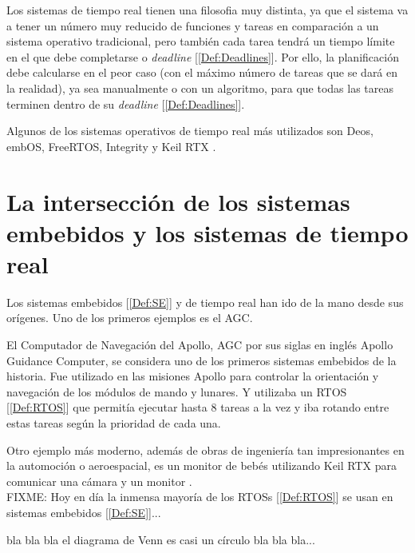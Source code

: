 Los sistemas de tiempo real tienen una filosofia muy distinta, ya que el sistema va a tener un número muy reducido de funciones y tareas en comparación a un sistema operativo tradicional, pero también cada tarea tendrá un tiempo límite en el que debe completarse o \emph{deadline} [\ref{Def:Deadlines}]. Por ello, la planificación debe calcularse en el peor caso (con el máximo número de tareas que se dará en la realidad), ya sea manualmente o con un algoritmo, para que todas las tareas terminen dentro de su \emph{deadline} [\ref{Def:Deadlines}].

Algunos de los sistemas operativos de tiempo real más utilizados son Deos, embOS, FreeRTOS, Integrity y Keil RTX \cite{lynx2024rtos}.

\section{La intersección de los sistemas embebidos y los sistemas de tiempo real}
Los sistemas embebidos [\ref{Def:SE}] y de tiempo real han ido de la mano desde sus orígenes. Uno de los primeros ejemplos es el AGC.

El Computador de Navegación del Apollo, AGC por sus siglas en inglés Apollo Guidance Computer, se considera uno de los primeros sistemas embebidos de la historia. Fue utilizado en las misiones Apollo para controlar la orientación y navegación de los módulos de mando y lunares. Y utilizaba un RTOS [\ref{Def:RTOS}] que permitía ejecutar hasta 8 tareas a la vez y iba rotando entre estas tareas según la prioridad de cada una.

Otro ejemplo más moderno, además de obras de ingeniería tan impresionantes en la automoción o aeroespacial, es un monitor de bebés  utilizando Keil RTX para comunicar una cámara y un monitor \cite{LLLBabyMonitor}.\\

FIXME:
Hoy en día la inmensa mayoría de los RTOSs [\ref{Def:RTOS}] se usan en sistemas embebidos [\ref{Def:SE}]...

bla bla bla el diagrama de Venn es casi un círculo bla bla bla...


